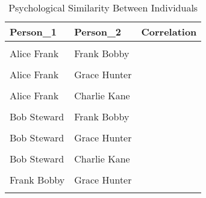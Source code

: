\documentclass[border=1mm]{standalone}
\begin{document}
\begin{table}[!h]
\centering
\caption{Psychological Similarity Between Individuals}
\centering
\fontsize{10}{12}\selectfont
\begin{tabular}[t]{ll>{\raggedleft\arraybackslash}p{1.5cm}}
\toprule
Person\_1 & Person\_2 & Correlation\\
\midrule
\cellcolor{gray!10}{Alice Frank} & \cellcolor{gray!10}{Bob Steward} & \cellcolor[HTML]{ECE51B}{\textcolor{white}{\cellcolor{gray!10}{0.94}}}\\
Alice Frank & Frank Bobby & \cellcolor[HTML]{E2E418}{\textcolor{white}{0.92}}\\
\cellcolor{gray!10}{Alice Frank} & \cellcolor{gray!10}{Eve Twingle} & \cellcolor[HTML]{424086}{\textcolor{white}{\cellcolor{gray!10}{-0.49}}}\\
Alice Frank & Grace Hunter & \cellcolor[HTML]{39568C}{\textcolor{white}{-0.34}}\\
\cellcolor{gray!10}{Alice Frank} & \cellcolor{gray!10}{Heidi Probosky} & \cellcolor[HTML]{482374}{\textcolor{white}{\cellcolor{gray!10}{-0.66}}}\\
\addlinespace
Alice Frank & Charlie Kane & \cellcolor[HTML]{482677}{\textcolor{white}{-0.63}}\\
\cellcolor{gray!10}{Alice Frank} & \cellcolor{gray!10}{David Turner} & \cellcolor[HTML]{463480}{\textcolor{white}{\cellcolor{gray!10}{-0.56}}}\\
Bob Steward & Frank Bobby & \cellcolor[HTML]{A8DB34}{\textcolor{white}{0.76}}\\
\cellcolor{gray!10}{Bob Steward} & \cellcolor{gray!10}{Eve Twingle} & \cellcolor[HTML]{424186}{\textcolor{white}{\cellcolor{gray!10}{-0.48}}}\\
Bob Steward & Grace Hunter & \cellcolor[HTML]{39568C}{\textcolor{white}{-0.34}}\\
\addlinespace
\cellcolor{gray!10}{Bob Steward} & \cellcolor{gray!10}{Heidi Probosky} & \cellcolor[HTML]{443983}{\textcolor{white}{\cellcolor{gray!10}{-0.53}}}\\
Bob Steward & Charlie Kane & \cellcolor[HTML]{472A7A}{\textcolor{white}{-0.62}}\\
\cellcolor{gray!10}{Bob Steward} & \cellcolor{gray!10}{David Turner} & \cellcolor[HTML]{453581}{\textcolor{white}{\cellcolor{gray!10}{-0.55}}}\\
Frank Bobby & Grace Hunter & \cellcolor[HTML]{423F85}{\textcolor{white}{-0.49}}\\
\cellcolor{gray!10}{Frank Bobby} & \cellcolor{gray!10}{Heidi Probosky} & \cellcolor[HTML]{440154}{\textcolor{white}{\cellcolor{gray!10}{-0.83}}}\\

\end{tabular}
\end{table}
\end{document}
